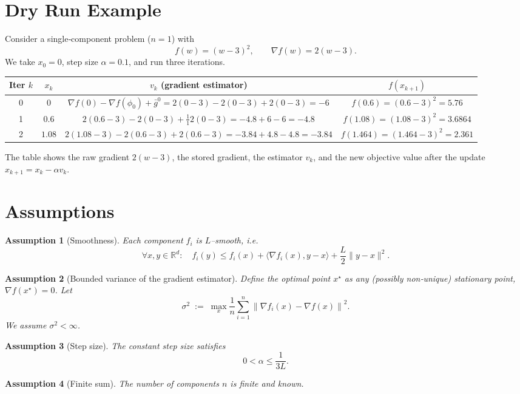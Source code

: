 \documentclass[11pt]{article}
\newtheorem{assumption}{Assumption}
\newcommand{\RR}{\mathbb{R}}
\newcommand{\norm}[1]{\left\lVert#1\right\rVert}
\newcommand{\grad}{\nabla}
\begin{document}
\section*{Dry Run Example}
Consider a single‑component problem ($n=1$) with  
\[
f(w)= (w-3)^2,\qquad \grad f(w)=2(w-3).
\]
We take $x_0=0$, step size $\alpha=0.1$, and run three iterations.

\begin{center}
\begin{tabular}{c|c|c|c}
\toprule
Iter $k$ & $x_k$ & $v_k$ (gradient estimator) & $f(x_{k+1})$\\
\midrule
0 & $0$ & $\grad f(0)-\grad f(\phi_0)+\bar g^0
      =2(0-3)-2(0-3)+2(0-3)= -6$ & $f(0.6)= (0.6-3)^2=5.76$\\
1 & $0.6$ & $2(0.6-3)-2(0-3)+\frac{1}{1}2(0-3)
      =-4.8+6-6=-4.8$ & $f(1.08)= (1.08-3)^2=3.6864$\\
2 & $1.08$ & $2(1.08-3)-2(0.6-3)+2(0.6-3)
      =-3.84+4.8-4.8=-3.84$ & $f(1.464)= (1.464-3)^2=2.361$\\
\bottomrule
\end{tabular}
\end{center}
The table shows the raw gradient $2(w-3)$, the stored gradient, the estimator $v_k$, and the new objective value after the update $x_{k+1}=x_k-\alpha v_k$.

\newpage
\section*{Assumptions}
\begin{assumption}[Smoothness]\label{ass:smooth}
Each component $f_i$ is $L$–smooth, i.e.
\[
\forall x,y\in\RR^{d}:\quad 
f_i(y)\le f_i(x)+\langle\grad f_i(x),y-x\rangle+\frac{L}{2}\|y-x\|^{2}.
\tag{A1}
\]
\end{assumption}
\begin{assumption}[Bounded variance of the gradient estimator]\label{ass:var}
Define the optimal point $x^\star$ as any (possibly non‑unique) stationary point,
$\grad f(x^\star)=0$.  Let 
\[
\sigma^{2}\;:=\;\max_{x}\frac{1}{n}\sum_{i=1}^{n}\norm{\grad f_i(x)-\grad f(x)}^{2}.
\tag{A2}
\]
We assume $\sigma^{2}<\infty$.
\end{assumption}
\begin{assumption}[Step size]\label{ass:stepsize}
The constant step size satisfies 
\[
0<\alpha\le\frac{1}{3L}.
\tag{A3}
\]
\end{assumption}
\begin{assumption}[Finite sum]\label{ass:finite}
The number of components $n$ is finite and known.
\end{assumption}
\end{document}
